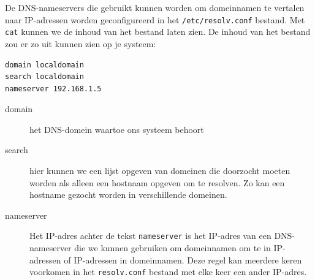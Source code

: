De DNS-nameservers die gebruikt kunnen worden om domeinnamen te vertalen naar IP-adressen worden geconfigureerd in het \texttt{/etc/resolv.conf} bestand. Met \texttt{cat} kunnen we de inhoud van het bestand laten zien. De inhoud van het bestand zou er zo uit kunnen zien op je systeem:
\begin{lstlisting}[language=bash]
domain localdomain
search localdomain
nameserver 192.168.1.5
\end{lstlisting}

\begin{description}
\item[domain] het DNS-domein waartoe ons systeem behoort
\item[search] hier kunnen we een lijst opgeven van domeinen die doorzocht moeten worden als alleen een hostnaam opgeven om te resolven. Zo kan een hostname gezocht worden in verschillende domeinen.
\item[nameserver] Het IP-adres achter de tekst \texttt{nameserver} is het IP-adres van een DNS-nameserver die we kunnen gebruiken om domeinnamen om te in IP-adressen of IP-adressen in domeinnamen. Deze regel kan meerdere keren voorkomen in het \texttt{resolv.conf} bestand met elke keer een ander IP-adres.
\end{description}

